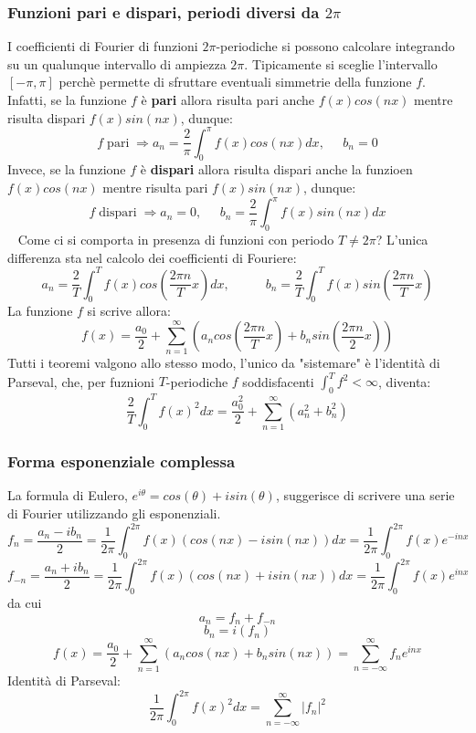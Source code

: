 \subsubsection{Funzioni pari e dispari, periodi diversi da $2\pi$}
I coefficienti di Fourier di funzioni $2\pi$-periodiche si possono calcolare integrando su un qualunque intervallo di ampiezza $2\pi$. Tipicamente si sceglie l'intervallo $[-\pi, \pi]$ perchè permette di sfruttare eventuali simmetrie della funzione $f$.\newline
Infatti, se la funzione $f$ è \textbf{pari} allora risulta pari anche $f(x)cos(nx)$ mentre risulta dispari $f(x)sin(nx)$, dunque:
\[
    f \; \text{pari}\; \Rightarrow a_n = \frac{2}{\pi} \int_{0}^{\pi}f(x) cos(nx) dx , \;\;\;\;\;b_n = 0
\]
Invece, se la funzione $f$ è \textbf{dispari} allora risulta dispari anche la funzioen $f(x)cos(nx)$ mentre risulta pari $f(x) sin(nx)$, dunque:
\[
    f \; \text{dispari}\; \Rightarrow a_n = 0, \;\;\;\;\;b_n = \frac{2}{\pi} \int_{0}^{\pi} f(x) sin(nx)dx
\]
\ \newline
Come ci si comporta in presenza di funzioni con periodo $T \neq 2\pi$?\newline
L'unica differenza sta nel calcolo dei coefficienti di Fouriere:
\[
    a_n = \frac{2}{T}\int_{0}^{T}f(x) cos\left( \frac{2\pi n}{T}x \right) dx, \;\;\;\;\; \;\;\;\;\; b_n = \frac{2}{T} \int_{0}^{T}f(x) sin\left( \frac{2\pi n}{T}x \right)
\]
La funzione $f$ si scrive allora:
\[
    f(x) = \frac{a_0}{2} + \sum_{n=1}^{\infty} \left( a_n cos\left( \frac{2\pi n}{T}x \right) + b_n sin \left( \frac{2\pi n}{2}x \right) \right)
\]
Tutti i teoremi valgono allo stesso modo, l'unico da "sistemare" è l'identità di Parseval, che, per fuznioni $T$-periodiche $f$ soddisfacenti $\int_{0}^{T} f^2 < \infty$, diventa:
\[
    \frac{2}{T} \int_{0}^{T}f(x)^2 dx = \frac{a_0^2}{2} + \sum_{n=1}^{\infty} (a_n^2 + b_n^2)
\]
\subsubsection{Forma esponenziale complessa}
La formula di Eulero, $e^{i \theta} = cos(\theta) + i sin(\theta)$, suggerisce di scrivere una serie di Fourier utilizzando gli esponenziali.
\[
    f_n =\frac{a_n-ib_n}{2} = \frac{1}{2\pi} \int_{0}^{2\pi}f(x)(cos(nx) - i sin(nx))dx = \frac{1}{2\pi} \int_{0}^{2\pi}f(x) e^{-inx}
\]
\[
    f_{-n} =\frac{a_n + ib_n}{2} = \frac{1}{2\pi} \int_{0}^{2\pi}f(x)(cos(nx) + i sin(nx))dx = \frac{1}{2\pi} \int_{0}^{2\pi}f(x) e^{inx}
\]
da cui
\[
    a_n = f_n + f_{-n}
\]
\[
    b_n = i (f_n)
\]
\[
    f(x) = \frac{a_0}{2} + \sum_{n=1}^{\infty} \left( a_n cos(nx) + b_n sin(nx) \right) = \sum_{n=-\infty}^{\infty} f_n e^{inx}
\]
\newline
Identità di Parseval:
\[
    \frac{1}{2\pi}\int_{0}^{2\pi}f(x)^2dx = \sum_{n=-\infty}^{\infty}|f_n|^2
\]
